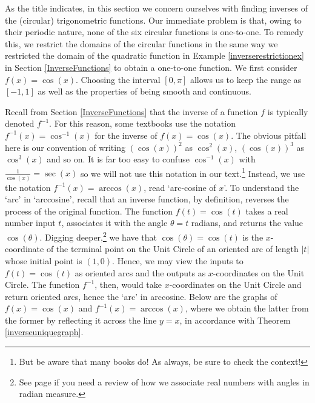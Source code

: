 \documentclass[12pt]{ximera}
\author{Stitz and Zeager}
\begin{document}
\setcounter{footnote}{0}

\label{ArcTrig}

As the title indicates, in this section we concern ourselves with finding inverses of the (circular) trigonometric functions.  Our immediate problem is that, owing to their periodic nature, none of the six circular functions is  one-to-one. To remedy this, we restrict the domains of the circular functions in the same way we restricted the domain of the quadratic function in Example \ref{inverserestrictionex} in Section \ref{InverseFunctions} to obtain a one-to-one function.  We first consider $f(x) = \cos(x)$. Choosing the interval $[0,\pi]$ allows us to keep the range as $[-1,1]$ as well as the properties of being smooth and continuous.

\begin{center}



\end{center} 

Recall from Section \ref{InverseFunctions} that the inverse of a function $f$ is typically denoted $f^{-1}$.  For this reason, some textbooks use the notation $f^{-1}(x) = \cos^{-1}(x)$ for the inverse of $f(x) = \cos(x)$.  The obvious pitfall here is our convention of writing $(\cos(x))^2$ as $\cos^{2}(x)$, $(\cos(x))^3$ as $\cos^{3}(x)$ and so on.  It is far too easy to confuse $\cos^{-1}(x)$ with  $\frac{1}{\cos(x)} = \sec(x)$ so we will not use this notation in our text.\footnote{But be aware that many books do! As always, be sure to check the context!}  Instead, we use the notation $f^{-1}(x) = \arccos(x)$, read `arc-cosine of $x$'.  To understand the `arc' in `arccosine', recall that an inverse function, by definition, reverses the process of the original function. The function $f(t) = \cos(t)$ takes a real number input $t$, associates it with the angle $\theta = t$ radians, and returns the value $\cos(\theta)$.  Digging deeper,\footnote{See page \pageref{wrappingfunction} if you need a review of how we associate real numbers with angles in radian measure.} we have that $\cos(\theta) = \cos(t)$ is the $x$-coordinate of the terminal point on the Unit Circle of an oriented arc of length $|t|$ whose initial point is $(1, 0)$.  Hence, we may view the inputs to $f(t) = \cos(t)$ as oriented arcs and the outputs as $x$-coordinates on the Unit Circle.  The function $f^{-1}$, then, would take $x$-coordinates on the Unit Circle and return oriented arcs, hence the `arc' in arccosine. Below are the graphs of $f(x) = \cos(x)$ and $f^{-1}(x) = \arccos(x)$, where we obtain the latter from the former by reflecting it across the line $y=x$, in accordance with Theorem \ref{inverseuniquegraph}. 
\end{document}
